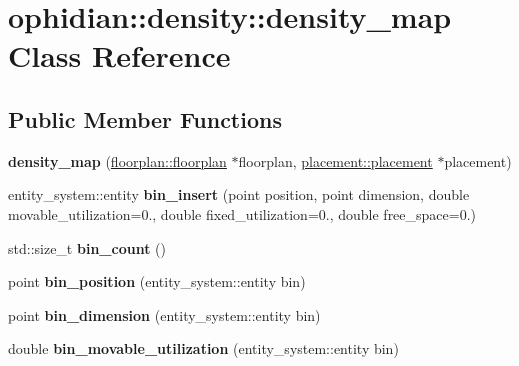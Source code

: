 \hypertarget{classophidian_1_1density_1_1density__map}{\section{ophidian\-:\-:density\-:\-:density\-\_\-map Class Reference}
\label{classophidian_1_1density_1_1density__map}
}
\subsection*{Public Member Functions}
\begin{DoxyCompactItemize}
\item 
\hypertarget{classophidian_1_1density_1_1density__map_a6cfffb418f526d3a74f4002aa5e5947e}{{\bfseries density\-\_\-map} (\hyperlink{classophidian_1_1floorplan_1_1floorplan}{floorplan\-::floorplan} $\ast$floorplan, \hyperlink{classophidian_1_1placement_1_1placement}{placement\-::placement} $\ast$placement)}\label{classophidian_1_1density_1_1density__map_a6cfffb418f526d3a74f4002aa5e5947e}

\item 
\hypertarget{classophidian_1_1density_1_1density__map_aadee728c21a73b78aed9375e808be7c4}{entity\-\_\-system\-::entity {\bfseries bin\-\_\-insert} (point position, point dimension, double movable\-\_\-utilization=0., double fixed\-\_\-utilization=0., double free\-\_\-space=0.)}\label{classophidian_1_1density_1_1density__map_aadee728c21a73b78aed9375e808be7c4}

\item 
\hypertarget{classophidian_1_1density_1_1density__map_a09b6c9050c047a00626262cc67843646}{std\-::size\-\_\-t {\bfseries bin\-\_\-count} ()}\label{classophidian_1_1density_1_1density__map_a09b6c9050c047a00626262cc67843646}

\item 
\hypertarget{classophidian_1_1density_1_1density__map_ad12080b88f42c8e1c8e9d5b1645457f7}{point {\bfseries bin\-\_\-position} (entity\-\_\-system\-::entity bin)}\label{classophidian_1_1density_1_1density__map_ad12080b88f42c8e1c8e9d5b1645457f7}

\item 
\hypertarget{classophidian_1_1density_1_1density__map_a5e46ee30282399e74ca676ce4fb48e3d}{point {\bfseries bin\-\_\-dimension} (entity\-\_\-system\-::entity bin)}\label{classophidian_1_1density_1_1density__map_a5e46ee30282399e74ca676ce4fb48e3d}

\item 
\hypertarget{classophidian_1_1density_1_1density__map_a49883d932bb482ce6320ca4db7e8ca14}{double {\bfseries bin\-\_\-movable\-\_\-utilization} (entity\-\_\-system\-::entity bin)}\label{classophidian_1_1density_1_1density__map_a49883d932bb482ce6320ca4db7e8ca14}


\end{DoxyCompactItemize}
